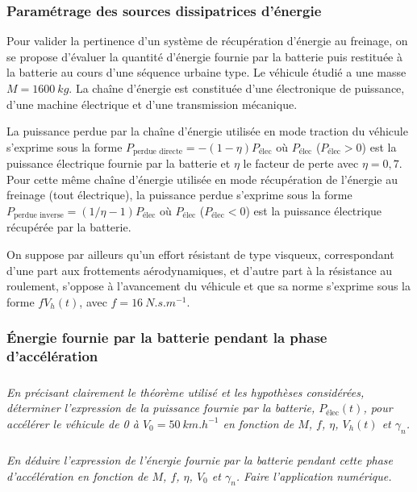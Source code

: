 \documentclass[10pt,fleqn]{article} %
\begin{document}
\begin{multicols}{2}
\subsubsection*{Paramétrage des sources dissipatrices d’énergie}
Pour valider la pertinence d’un système de récupération d’énergie au freinage, on se propose d’évaluer la quantité
d’énergie fournie par la batterie puis restituée à la batterie au cours d’une séquence urbaine type.
Le véhicule étudié a une masse $M = \SI{1600}{kg}$. La chaîne d’énergie est constituée d’une électronique de puissance,
d’une machine électrique et d’une transmission mécanique.

La puissance perdue par la chaîne d’énergie utilisée en mode traction du véhicule s’exprime sous la forme
$P_{\text{perdue directe}} = -(1-\eta)P_{\text {élec}}$ où $P_{\text{élec}}$ ($P_{\text{élec}}>0$) est la puissance électrique fournie par la batterie et $\eta$ le facteur de perte avec $\eta = 0,7$.
Pour cette même chaîne d’énergie utilisée en mode récupération de l’énergie au freinage (tout électrique), la
puissance perdue s’exprime sous la forme $P_{\text{perdue inverse}}= (1/\eta - 1)P_{\text{élec}}$
où $P_{\text{élec}}$ ($P_{\text{élec}}<0$) est la puissance électrique récupérée par la batterie.

On suppose par ailleurs qu’un effort résistant de type visqueux, correspondant d’une part aux frottements
aérodynamiques, et d’autre part à la résistance au roulement, s’oppose à l’avancement du véhicule et que sa
norme s’exprime sous la forme $fV_h(t)$, avec $f = \SI{16}{N.s.m^{-1}}$.

\subsubsection*{Énergie fournie par la batterie pendant la phase d’accélération}


\subparagraph{}\textit{En précisant clairement le théorème utilisé et les hypothèses considérées, déterminer l’expression de la puissance fournie par la batterie, $P_{\text{élec}}(t)$, pour accélérer le véhicule de 0 à $V_0 = \SI{50}{km.h^{-1}}$ en fonction de $M$, $f$, $\eta$, $V_h(t)$ et $\gamma_n$.}
\ifprof
\begin{corrige}
\end{corrige}
\else
\fi


\subparagraph{}\textit{En déduire l’expression de l’énergie fournie par la batterie pendant cette phase d’accélération en fonction de $M$, $f$, $\eta$, $V_0$ et $\gamma_n$. Faire l’application numérique.}
\ifprof
\begin{corrige}
\end{corrige}
\else
\fi


\end{multicols}
\end{document}
